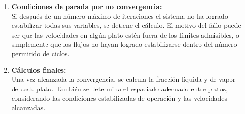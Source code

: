 \begin{enumerate}
      \item \textbf{Condiciones de parada por no convergencia:}\\
            Si después de un número máximo de iteraciones el sistema no ha logrado estabilizar todas sus variables, se detiene el cálculo. El motivo del fallo puede ser que las velocidades en algún plato estén fuera de los límites admisibles, o simplemente que los flujos no hayan logrado estabilizarse dentro del número permitido de ciclos.

      \item \textbf{Cálculos finales:}\\
            Una vez alcanzada la convergencia, se calcula la fracción líquida y de vapor de cada plato. También se determina el espaciado adecuado entre platos, considerando las condiciones estabilizadas de operación y las velocidades alcanzadas.
\end{enumerate}

